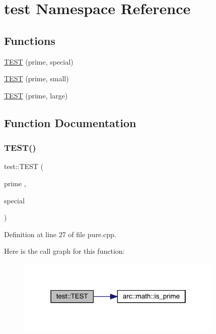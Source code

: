 \hypertarget{namespacetest}{}\section{test Namespace Reference}
\label{namespacetest}
\subsection*{Functions}
\begin{DoxyCompactItemize}
\item 
\mbox{\hyperlink{namespacetest_a4c2a3ec0b4fe87abc7b3f29e2e9ea0c6}{T\+E\+ST}} (prime, special)
\item 
\mbox{\hyperlink{namespacetest_a1b8e15e415b70d1f246be13c30eec6a3}{T\+E\+ST}} (prime, small)
\item 
\mbox{\hyperlink{namespacetest_a9acfb8041dd64550d8e5ba096a077529}{T\+E\+ST}} (prime, large)
\end{DoxyCompactItemize}


\subsection{Function Documentation}
\mbox{\label{namespacetest_a4c2a3ec0b4fe87abc7b3f29e2e9ea0c6}} 
\subsubsection{\texorpdfstring{TEST()}{TEST()}\hspace{0.1cm}{\footnotesize\ttfamily [1/3]}}
{\footnotesize\ttfamily test\+::\+T\+E\+ST (\begin{DoxyParamCaption}\item[{prime}]{,  }\item[{special}]{ }\end{DoxyParamCaption})}



Definition at line 27 of file pure.\+cpp.

Here is the call graph for this function\+:
\nopagebreak
\begin{figure}[H]
\begin{center}
\leavevmode
\includegraphics[width=280pt]{namespacetest_a4c2a3ec0b4fe87abc7b3f29e2e9ea0c6_cgraph}
\end{center}
\end{figure}
\mbox{\label{namespacetest_a1b8e15e415b70d1f246be13c30eec6a3}} 
